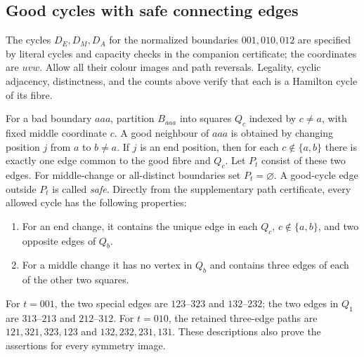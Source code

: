 \documentclass[11pt]{article}
\theoremstyle{remark}
\numberwithin{equation}{section}
\numberwithin{table}{section}
\begin{document}
\subsection{Good cycles with safe connecting edges}
The cycles $D_E,D_M,D_A$ for the normalized boundaries $001,010,012$
are specified by literal cycles and capacity checks in the companion
certificate; the coordinates are $uvw$.
Allow all their colour images and path reversals. Legality, cyclic adjacency, distinctness, and the counts
above verify that each is a Hamilton cycle of its fibre.

For a bad boundary $aaa$, partition $B_{aaa}$ into squares $Q_c$ indexed
by $c\ne a$, with fixed middle coordinate $c$. A good neighbour of
$aaa$ is obtained by changing position $j$ from $a$ to $b\ne a$.
If $j$ is an end position, then for each $c\notin\{a,b\}$ there is
exactly one edge common to the good fibre and $Q_c$. Let $P_t$ consist
of these two edges. For middle-change or all-distinct boundaries set
$P_t=\varnothing$. A good-cycle edge outside $P_t$ is called \emph{safe}.
Directly from the supplementary path certificate, every allowed cycle has the following properties:
\begin{enumerate}
\item For an end change, it contains the unique edge in each
      $Q_c$, $c\notin\{a,b\}$, and two opposite edges of $Q_b$.
\item For a middle change it has no vertex in $Q_b$ and contains
      three edges of each of the other two squares.
\end{enumerate}
For $t=001$, the two special edges are $123$--$323$ and $132$--$232$;
the two edges in $Q_1$ are $313$--$213$ and $212$--$312$.
For $t=010$, the retained three-edge paths are
$121,321,323,123$ and $132,232,231,131$.
These descriptions also prove the assertions for every symmetry image.
\end{document}
